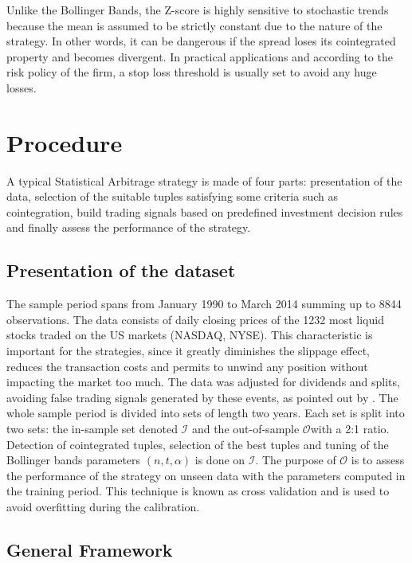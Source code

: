 \documentclass[11pt,a4,twosided,singlespacing,titlepagenumber=on]{scrreprt}
\numberwithin{equation}{chapter} %
\theoremstyle{remark}
\begin{document}
Unlike the Bollinger Bands, the Z-score is highly sensitive to stochastic trends because the mean is assumed to be strictly constant due to the nature of the strategy. In other words, it can be dangerous if the spread loses its cointegrated property and becomes divergent. In practical applications and according to the risk policy of the firm, a stop loss threshold is usually set to avoid any huge losses.

\chapter{Procedure}
A typical Statistical Arbitrage strategy is made of four parts: presentation of the data, selection of the suitable tuples satisfying some criteria such as cointegration, build trading signals based on predefined investment decision rules and finally assess the performance of the strategy.

\section{Presentation of the dataset}
The sample period spans from January 1990 to March 2014 summing up to 8844 observations. The data consists of daily closing prices of the 1232 most liquid stocks traded on the US markets (NASDAQ, NYSE). This characteristic is important for the strategies, since it greatly diminishes the slippage effect, reduces the transaction costs and permits to unwind any position without impacting the market too much. The data was adjusted for dividends and splits, avoiding false trading signals generated by these events, as pointed out by \cite{broussard2012}. The whole sample period is divided into sets of length two years. Each set is split into two sets: the in-sample set denoted $\mathcal{I}$ and the out-of-sample $\mathcal{O}$with a 2:1 ratio. Detection of cointegrated tuples, selection of the best tuples and tuning of the Bollinger bands parameters $(n,t,\alpha)$ is done on $\mathcal{I}$. The purpose of $\mathcal{O}$ is to assess the performance of the strategy on unseen data with the parameters computed in the training period. This technique is known as cross validation and is used to avoid overfitting during the calibration. 


\section{General Framework}
\end{document}
